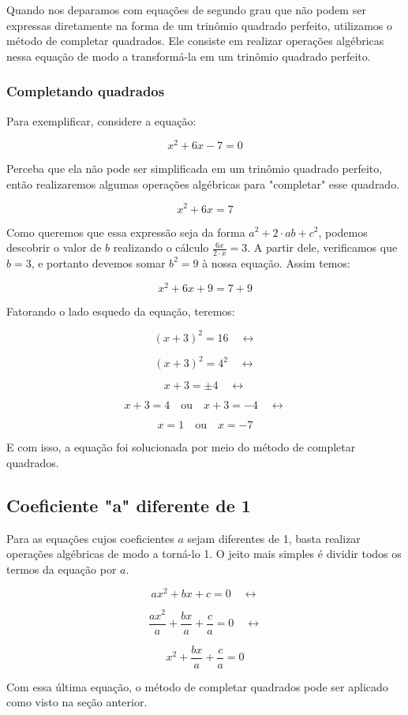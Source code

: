 \documentclass[../resumo.tex]{subfiles}
\begin{document}
	Quando nos deparamos com equações de segundo grau que não podem ser expressas diretamente
	na forma de um trinômio quadrado perfeito, utilizamos o método de completar quadrados.
	Ele consiste em realizar operações algébricas nessa equação de modo a transformá-la em um
	trinômio quadrado perfeito.
	
	\subsubsection{Completando quadrados}
	
	Para exemplificar, considere a equação:

	\[x^2 + 6x - 7 = 0\]

	Perceba que ela não pode ser simplificada em um trinômio quadrado perfeito, então realizaremos
	algumas operações algébricas para "completar" esse quadrado.

	\[x^2 + 6x = 7\]

	Como queremos que essa expressão seja da forma \(a^2 + 2\cdot ab + c^2\), podemos descobrir o 
	valor de $b$ realizando o cálculo \(\frac{6x}{2\cdot x} = 3\). A partir dele, verificamos que $b = 3$,
	e portanto devemos somar $b^2 = 9$ à nossa equação. Assim temos:

	\[x^2 + 6x + 9 = 7 + 9\]

	Fatorando o lado esquedo da equação, teremos:

	\[(x + 3)^2 = 16 \quad \leftrightarrow\]

	\[(x + 3)^2 = 4^2 \quad \leftrightarrow\]

	\[x + 3 = \pm 4 \quad \leftrightarrow\]

	\[x + 3 = 4 \quad \textrm{ou} \quad x + 3 = -4 \quad \leftrightarrow\]

	\[x = 1 \quad \textrm{ou} \quad x = -7\]

	E com isso, a equação foi solucionada por meio do método de
	completar quadrados.


	\subsection{Coeficiente "a" diferente de 1}

	Para as equações cujos coeficientes $a$ sejam diferentes de 1, basta
	realizar operações algébricas de modo a torná-lo 1. O jeito mais simples
	é dividir todos os termos da equação por $a$.

	\[ax^2 + bx + c = 0 \quad \leftrightarrow \]

	\[\frac{ax^2}{a} + \frac{bx}{a} + \frac{c}{a} = 0 \quad \leftrightarrow \]

	\[x^2 + \frac{bx}{a} + \frac{c}{a} = 0\]

	Com essa última equação, o método de completar quadrados pode ser aplicado como visto
	na seção anterior.
\end{document}
